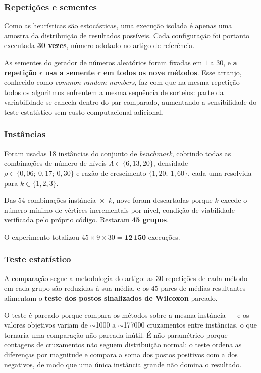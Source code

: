 \documentclass[12pt,a4paper]{article}
\begin{document}
\subsubsection{Repetições e sementes}

Como as heurísticas são estocásticas, uma execução isolada é apenas uma
amostra da distribuição de resultados possíveis. Cada configuração foi
portanto executada \textbf{30 vezes}, número adotado no artigo de
referência.

As sementes do gerador de números aleatórios foram fixadas em $1$ a $30$,
e \textbf{a repetição $r$ usa a semente $r$ em todos os nove métodos}.
Esse arranjo, conhecido como \textit{common random numbers}, faz com que
na mesma repetição todos os algoritmos enfrentem a mesma sequência de
sorteios: parte da variabilidade se cancela dentro do par comparado,
aumentando a sensibilidade do teste estatístico sem custo computacional
adicional.

\subsubsection{Instâncias}

Foram usadas 18 instâncias do conjunto de \textit{benchmark}, cobrindo
todas as combinações de número de níveis $\Lambda \in \{6, 13, 20\}$,
densidade $\rho \in \{0{,}06;\ 0{,}17;\ 0{,}30\}$ e razão de crescimento
$\{1{,}20;\ 1{,}60\}$, cada uma resolvida para $k \in \{1, 2, 3\}$.

Das 54 combinações instância~$\times$~$k$, nove foram descartadas porque
$k$ excede o número mínimo de vértices incrementais por nível, condição
de viabilidade verificada pelo próprio código. Restaram
\textbf{45 grupos}.

O experimento totalizou $45 \times 9 \times 30 =
\mathbf{12\,150}$ execuções.

\subsubsection{Teste estatístico}

A comparação segue a metodologia do artigo: as 30 repetições de cada
método em cada grupo são reduzidas à sua média, e os 45 pares de médias
resultantes alimentam o \textbf{teste dos postos sinalizados de Wilcoxon}
pareado.

O teste é pareado porque compara os métodos sobre a mesma instância --- e
os valores objetivos variam de $\sim$\num{1000} a $\sim$\num{177000}
cruzamentos entre instâncias, o que tornaria uma comparação não pareada
inútil. É não paramétrico porque contagens de cruzamentos não seguem
distribuição normal: o teste ordena as diferenças por magnitude e compara
a soma dos postos positivos com a dos negativos, de modo que uma única
instância grande não domina o resultado.
\end{document}
